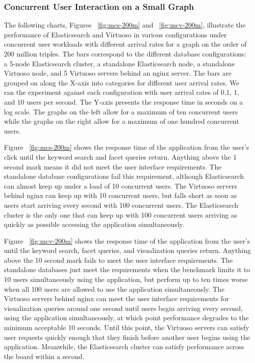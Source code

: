 \subsubsection{Concurrent User Interaction on a Small Graph} 
The following charts, Figures ~\ref{fig:mcs-200m} and ~\ref{fig:mcv-200m}, illustrate the performance of Elasticsearch and Virtuoso in various configurations under concurrent user workloads with different arrival rates for a graph on the order of 200 million triples.
The bars correspond to the different database configurations: a 5-node Elasticsearch cluster, a standalone Elasticsearch node, a standalone Virtuoso node, and 5 Virtuoso servers behind an nginx server.  
The bars are grouped on along the X-axis into categories for different user arrival rates.
We ran the experiment against each configuration with user arrival rates of 0.1, 1, and 10 users per second.
The Y-axis presents the response time in seconds on a log scale.  
The graphs on the left allow for a maximum of ten concurrent users while the graphs on the right allow for a maximum of one hundred concurrent users.  

Figure ~\ref{fig:mcs-200m} shows the response time of the application from the user's click until the keyword search and facet queries return.  Anything above the 1 second mark means it did not meet the user interface requirements.  
The standalone database configurations fail this requirement, although Elasticsearch can almost keep up under a load of 10 concurrent users.
The Virtuoso servers behind nginx can keep up with 10 concurrent users, but falls short as soon as users start arriving every second with 100 concurrent users.
The Elasticsearch cluster is the only one that can keep up with 100 concurrent users arriving as quickly as possible accessing the application simultaneously.

Figure ~\ref{fig:mcv-200m} shows the response time of the application from the user's until the keyword search, facet queries, and visualization queries return.  Anything above the 10 second mark fails to meet the user interface requirements.
The standalone databases just meet the requirements when the benchmark limits it to 10 users simultaneously using the application, but perform up to ten times worse when all 100 users are allowed to use the application simultaneously.
The Virtuoso servers behind nginx can meet the user interface requirements for visualization queries around one second until users begin arriving every second, using the application simultaneously, at which point performance degrades to the minimum acceptable 10 seconds.
Until this point, the Virtuoso servers can satisfy user requests quickly enough that they finish before another user begins using the application. 
Meanwhile, the Elasticsearch cluster can satisfy performance across the board within a second.  

